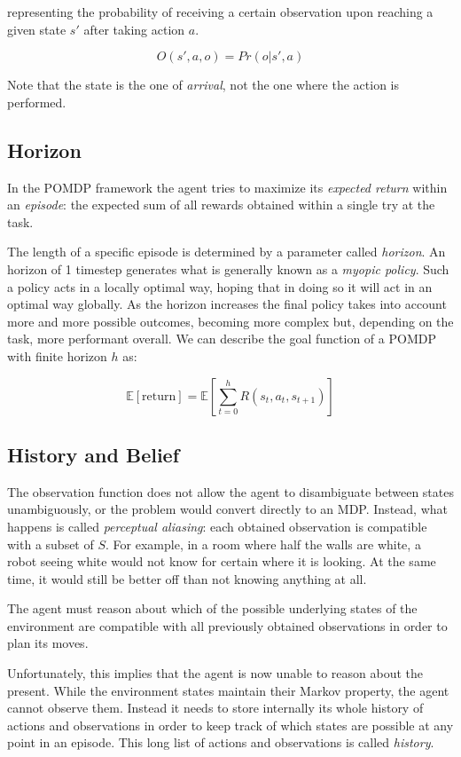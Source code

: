 representing the probability of receiving a certain observation upon reaching a given state $s'$
after taking action $a$.

\[ O(s', a, o) = Pr(o | s', a) \]

Note that the state is the one of \textit{arrival}, not the one where the action is performed.

\subsection{Horizon}

In the POMDP framework the agent tries to maximize its \textit{expected return} within an
\textit{episode}: the expected sum of all rewards obtained within a single try at the task.

The length of a specific episode is determined by a parameter called \textit{horizon}. An horizon of
1 timestep generates what is generally known as a \textit{myopic policy}. Such a policy acts in a
locally optimal way, hoping that in doing so it will act in an optimal way globally. As the horizon
increases the final policy takes into account more and more possible outcomes, becoming more complex
but, depending on the task, more performant overall. We can describe the goal function of a POMDP
with finite horizon $h$ as:

\[ \mathbb{E}[\text{return}] = \mathbb{E} \left [ \sum_{t=0}^{h} R(s_t, a_t, s_{t+1}) \right ] \]

\subsection{History and Belief}

The observation function does not allow the agent to disambiguate between states unambiguously, or
the problem would convert directly to an MDP. Instead, what happens is called \textit{perceptual
aliasing}: each obtained observation is compatible with a subset of $S$. For example, in a room
where half the walls are white, a robot seeing white would not know for certain where it is looking.
At the same time, it would still be better off than not knowing anything at all.

The agent must reason about which of the possible underlying states of the environment are
compatible with all previously obtained observations in order to plan its moves.

Unfortunately, this implies that the agent is now unable to reason about the present. While the
environment states maintain their Markov property, the agent cannot observe them. Instead it needs
to store internally its whole history of actions and observations in order to keep track of which
states are possible at any point in an episode. This long list of actions and observations is called
\textit{history}.

